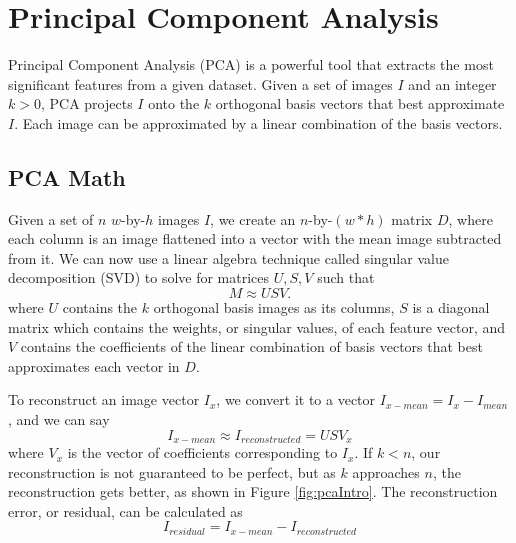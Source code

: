 %
\chapter{Principal Component Analysis}
\label{cpt:pca}

Principal Component Analysis (PCA) is a powerful tool that extracts the most significant features from a given dataset.  Given a set of images $I$ and an integer $k>0$, PCA projects $I$ onto the $k$ orthogonal basis vectors that best approximate $I$.  Each image can be approximated by a linear combination of the basis vectors.

\section{PCA Math}

Given a set of $n$ $w$-by-$h$ images $I$, we create an $n$-by-$(w*h)$ matrix $D$, where each column is an image flattened into a vector with the mean image subtracted from it.  We can now use a linear algebra technique called singular value decomposition (SVD) to solve for matrices $U, S, V$ such that $$M \approx USV.$$where $U$ contains the $k$ orthogonal basis images as its columns, $S$ is a diagonal matrix which contains the weights, or singular values, of each feature vector, and $V$ contains the coefficients of the linear combination of basis vectors that best approximates each vector in $D$.

To reconstruct an image vector $I_x$, we convert it to a vector $I_{x-mean} = I_x - I_{mean}$, and we can say $$I_{x-mean} \approx I_{reconstructed} = USV_x$$where $V_x$ is the vector of coefficients corresponding to $I_x$.  If $k < n$, our reconstruction is not guaranteed to be perfect, but as $k$ approaches $n$, the reconstruction gets better, as shown in Figure \ref{fig:pcaIntro}.  The reconstruction error, or residual, can be calculated as $$I_{residual} = I_{x-mean} - I_{reconstructed}$$


